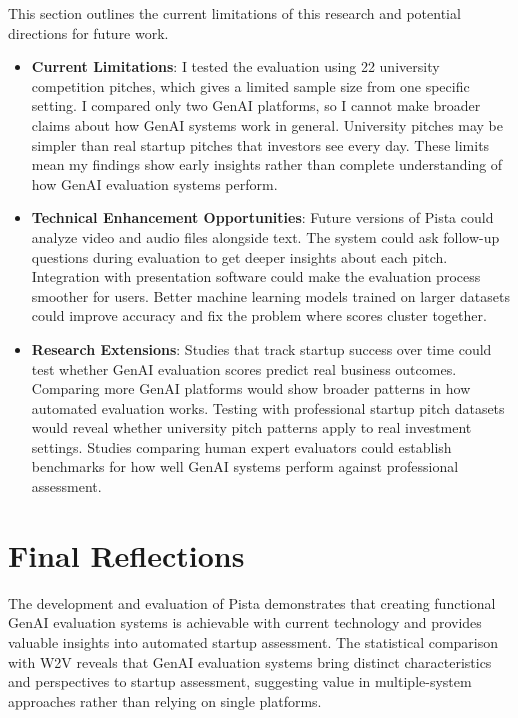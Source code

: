 This section outlines the current limitations of this research and potential directions for future work.

\begin{itemize}
    \item \textbf{Current Limitations}: I tested the evaluation using 22 university competition pitches, which gives a limited sample size from one specific setting. I compared only two GenAI platforms, so I cannot make broader claims about how GenAI systems work in general. University pitches may be simpler than real startup pitches that investors see every day. These limits mean my findings show early insights rather than complete understanding of how GenAI evaluation systems perform.

    \item \textbf{Technical Enhancement Opportunities}: Future versions of Pista could analyze video and audio files alongside text. The system could ask follow-up questions during evaluation to get deeper insights about each pitch. Integration with presentation software could make the evaluation process smoother for users. Better machine learning models trained on larger datasets could improve accuracy and fix the problem where scores cluster together.

    \item \textbf{Research Extensions}: Studies that track startup success over time could test whether GenAI evaluation scores predict real business outcomes. Comparing more GenAI platforms would show broader patterns in how automated evaluation works. Testing with professional startup pitch datasets would reveal whether university pitch patterns apply to real investment settings. Studies comparing human expert evaluators could establish benchmarks for how well GenAI systems perform against professional assessment.
\end{itemize}

\section{Final Reflections}
\label{sec:final-thoughts}

The development and evaluation of Pista demonstrates that creating functional GenAI evaluation systems is achievable with current technology and provides valuable insights into automated startup assessment. The statistical comparison with W2V reveals that GenAI evaluation systems bring distinct characteristics and perspectives to startup assessment, suggesting value in multiple-system approaches rather than relying on single platforms.

